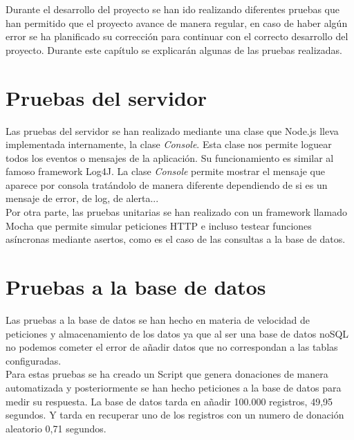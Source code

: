 Durante el desarrollo del proyecto se han ido realizando diferentes pruebas que han permitido que el proyecto avance de manera regular, en caso de haber algún error se ha planificado su corrección para continuar con el correcto desarrollo del proyecto. Durante este capítulo se explicarán algunas de las pruebas realizadas.

\section{Pruebas del servidor}
Las pruebas del servidor se han realizado mediante una clase que Node.js lleva implementada internamente, la clase \textit{Console}. Esta clase nos permite loguear todos los eventos o mensajes de la aplicación. Su funcionamiento es similar al famoso framework Log4J. La clase \textit{Console} permite mostrar el mensaje que aparece por consola tratándolo de manera diferente dependiendo de si es un mensaje de error, de log, de alerta...\\

Por otra parte, las pruebas unitarias se han realizado con un framework llamado Mocha\cite{mocha} que permite simular peticiones HTTP e incluso testear funciones asíncronas mediante asertos, como es el caso de las consultas a la base de datos.

\section{Pruebas a la base de datos}
Las pruebas a la base de datos se han hecho en materia de velocidad de peticiones y almacenamiento de los datos ya que al ser una base de datos noSQL no podemos cometer el error de añadir datos que no correspondan a las tablas configuradas.\\

Para estas pruebas se ha creado un Script que genera donaciones de manera automatizada y posteriormente se han hecho peticiones a la base de datos para medir su respuesta. La base de datos tarda en añadir 100.000 registros, 49,95 segundos. Y tarda en recuperar uno de los registros con un numero de donación aleatorio 0,71 segundos.\\
\newpage
{}
